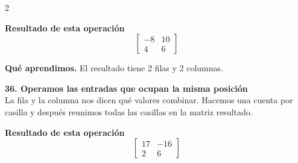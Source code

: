 \documentclass[11pt,a4paper,landscape]{article}
\begin{document}
\begin{multicols*}{2}
\begin{minipage}{\linewidth}
\par{}\par\smallskip
\par\smallskip \textbf{Resultado de esta operación}\[\begin{bmatrix}-8 & 10\\4 & 6\end{bmatrix}\]
\par\smallskip\textbf{Qué aprendimos.} El resultado tiene 2 filas y 2 columnas.
\end{minipage}\par\medskip
\noindent\begin{minipage}{\linewidth}\textbf{36. Operamos las entradas que ocupan la misma posición}\\[2pt]La fila y la columna nos dicen qué valores combinar. Hacemos una cuenta por casilla y después reunimos todas las casillas en la matriz resultado.
\par{}\par\smallskip
\par\smallskip \textbf{Resultado de esta operación}\[\begin{bmatrix}17 & -16\\2 & 6\end{bmatrix}\]

\end{minipage}
\end{multicols*}
\end{document}
